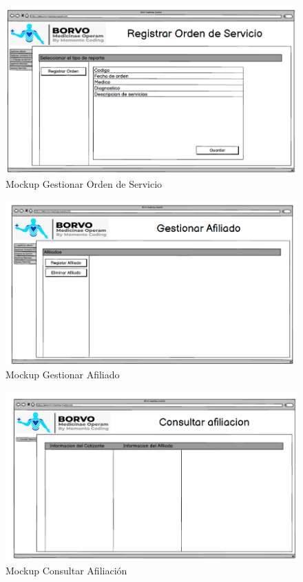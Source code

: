 \documentclass[12pt,a4paper]{article}
\begin{document}
\begin{figure}[H]
\centering
{\includegraphics[width=1\textwidth]{Mockup_7.png}\par}
\caption{Mockup Gestionar Orden de Servicio}
\end{figure}
\begin{figure}[H]
\centering
{\includegraphics[width=1\textwidth]{Mockup_8.png}\par}
\caption{Mockup Gestionar Afiliado}
\end{figure}
\begin{figure}[H]
\centering
{\includegraphics[width=1\textwidth]{Mockup_9.png}\par}
\caption{Mockup Consultar Afiliación}
\end{figure}
\end{document}
